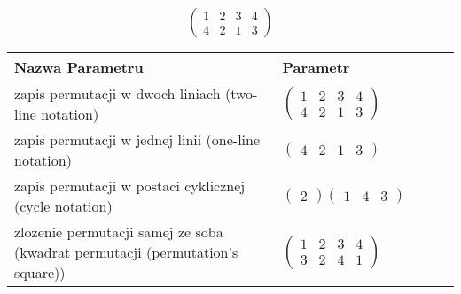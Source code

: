 \documentclass[12pt]{article}
\begin{document}
\subsection{}
\begin{center}
\[
\begin{pmatrix}
	1 & 2 & 3 & 4 \\ 
	4 & 2 & 1 & 3 
\end{pmatrix}
\]

\begin{tabular}{|m{0.6\linewidth}|m{0.4\linewidth}|}
	\hline
	Nazwa Parametru & Parametr \\
	\hline
	zapis permutacji w dwoch liniach (two-line notation) & $\begin{pmatrix} 1 & 2 & 3 & 4 \\ 
4 & 2 & 1 & 3 \end{pmatrix}$ \\ 
	\hline
	zapis permutacji w jednej linii (one-line notation) & $\begin{pmatrix} 4 & 2 & 1 & 3 \end{pmatrix}$ \\ 
	\hline
	zapis permutacji w postaci cyklicznej (cycle notation) & $\begin{pmatrix} 2 \end{pmatrix} \begin{pmatrix} 1 & 4 & 3 \end{pmatrix} $ \\ 
	\hline
	zlozenie permutacji samej ze soba (kwadrat permutacji (permutation's square)) & $\begin{pmatrix} 1 & 2 & 3 & 4 \\ 
3 & 2 & 4 & 1 \end{pmatrix}$ \\ 
	\hline
\end{tabular}
\end{center}
\end{document}
